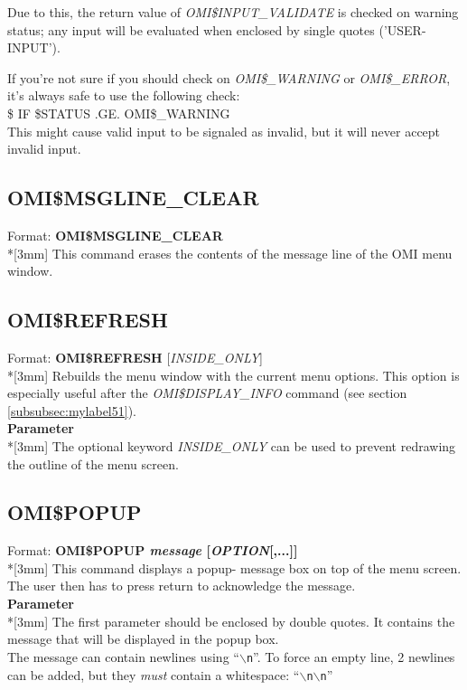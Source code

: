 \documentclass[a4paper]{book}
\newcommand{\vs}{\vspace{3mm}}
\renewcommand{\indent}{\hspace*{5mm}}
\begin{document}
Due to this, the return value of \textsl{OMI{\$}INPUT{\_}VALIDATE} is checked on warning status; any input 
will be evaluated when enclosed by single quotes ('USER-INPUT').

\vs

If you're not sure if you should check on \textsl{OMI{\$}{\_}WARNING} or 
\textsl{OMI{\$}{\_}ERROR}, it's always safe to use the following check: \\
\indent\textsf{{\$} IF {\$}STATUS .GE. OMI{\$}{\_}WARNING} \\
This might cause valid input to be signaled as invalid, but it will never 
accept invalid input.

\subsection{OMI{\$}MSGLINE{\_}CLEAR}
\label{subsubsec:mylabel57}

\indent Format: \textbf{OMI{\$}MSGLINE{\_}CLEAR}\\*[3mm]
This command erases the contents of the message line of the OMI menu window.

\subsection{OMI{\$}REFRESH}
\label{subsubsec:mylabel58}

\indent Format: \textbf{OMI{\$}REFRESH} [\textit{INSIDE{\_}ONLY}]\\*[3mm]
Rebuilds the menu window with the current menu options. This option is 
especially useful after the \textsl{OMI{\$}DISPLAY{\_}INFO} command (see section \ref{subsubsec:mylabel51}).\\[3mm]
\textbf{Parameter}\\*[3mm]
The optional keyword \textsl{INSIDE{\_}ONLY} can be used to prevent redrawing the outline of the menu screen.

\subsection{OMI{\$}POPUP}
\label{subsubsec:mylabel59}


\indent Format: \textbf{OMI{\$}POPUP \textit{message} [\textit{OPTION}[,...]]}\\*[3mm]
This command displays a popup- message box on top of the menu screen. The 
user then has to press return to acknowledge the message.\\[3mm]
\textbf{Parameter}\\*[3mm]
The first parameter should be enclosed by double quotes. It contains the 
message that will be displayed in the popup box.\\
The message can contain newlines using ``\texttt{\ensuremath{\backslash}n}''. To force an empty line, 2 newlines can be added, but they \textit{must} contain a whitespace: ``\texttt{\ensuremath{\backslash}n\textvisiblespace\ensuremath{\backslash}n}''\\[3mm]
\end{document}
